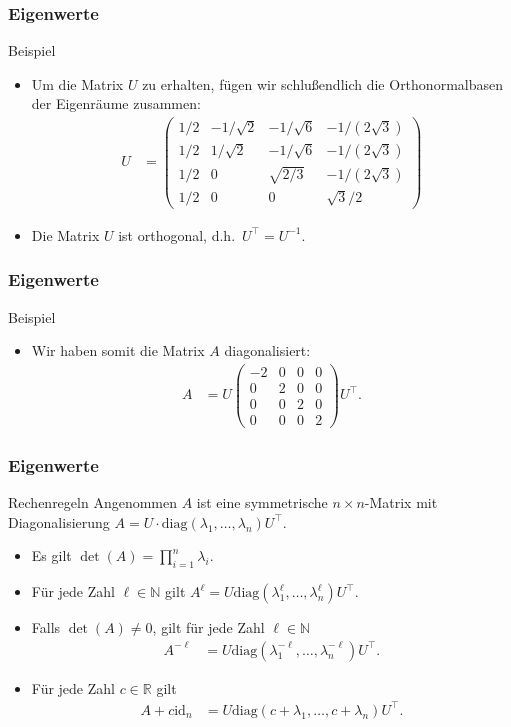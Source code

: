\documentclass{beamer}
\newcommand\NN{\mathbb N}
\newcommand\RR{\mathbb R}
\newcommand{\id}{\mathrm{id}}
\newcommand{\diag}{\mathrm{diag}}
\newcommand{\trans}{\top}
\renewcommand{\ae}{\"a}
\newcommand{\ue}{\"u}
\newcommand{\mytitle}{Eigenwerte}
\begin{document}
\begin{frame}\frametitle{\mytitle}
	\begin{block}{Beispiel}
	\begin{itemize}
		\item Um die Matrix $U$ zu erhalten, f\ue gen wir schlu\ss endlich die Orthonormalbasen der Eigenr\ae ume zusammen:
			\begin{align*}
				U&=\begin{pmatrix}
					1/2&-1/\sqrt 2&-1/\sqrt 6&-1/(2\sqrt 3)\\
					1/2&1/\sqrt 2&-1/\sqrt 6&-1/(2\sqrt 3)\\
					1/2&0&\sqrt{2/3}&-1/(2\sqrt 3)\\
					1/2&0&0&\sqrt 3/2
				\end{pmatrix}
			\end{align*}
		\item Die Matrix $U$ ist orthogonal, d.h.\ $U^\trans=U^{-1}$.
	\end{itemize}
	\end{block}
\end{frame}

\begin{frame}\frametitle{\mytitle}
	\begin{block}{Beispiel}
	\begin{itemize}
		\item Wir haben somit die Matrix $A$ diagonalisiert:
			\begin{align*}
				A&=U\begin{pmatrix}
					-2&0&0&0\\0&2&0&0\\0&0&2&0\\0&0&0&2
				\end{pmatrix}
				U^\trans.
			\end{align*}
	\end{itemize}
	\end{block}
\end{frame}

\begin{frame}\frametitle{\mytitle}
	\begin{block}{Rechenregeln}
		Angenommen $A$ ist eine symmetrische $n\times n$-Matrix mit Diagonalisierung $A=U\cdot\diag(\lambda_1,\ldots,\lambda_n)U^\trans$.
	\begin{itemize}
		\item Es gilt $\det(A)=\prod_{i=1}^n\lambda_i$.
		\item F\ue r jede Zahl $\ell\in\NN$ gilt $ A^\ell=U\diag(\lambda_1^\ell,\ldots,\lambda_n^\ell)U^\trans.  $
		\item Falls $\det(A)\neq0$, gilt f\ue r jede Zahl $\ell\in\NN$
			\begin{align*}
				A^{-\ell}&=U\diag(\lambda_1^{-\ell},\ldots,\lambda_n^{-\ell})U^\trans.
			\end{align*}
		\item F\ue r jede Zahl $c\in\RR$ gilt
			\begin{align*}
				A+c\id_n&=U\diag(c+\lambda_1,\ldots,c+\lambda_n)U^\trans.
			\end{align*}
	\end{itemize}
	\end{block}
\end{frame}
\end{document}
